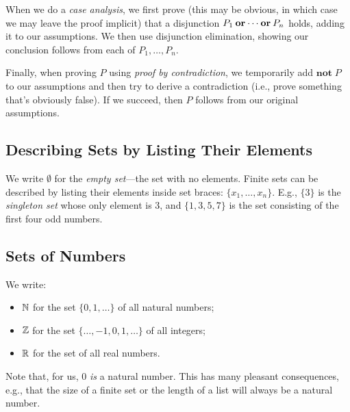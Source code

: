 When we do a \emph{case analysis}, we first prove (this may be
%
%
obvious, in which case we may leave the proof implicit) that a disjunction
$P_1 \mathbin{\mathbf{or}} \cdots \mathbin{\mathbf{or}} P_n$ holds, adding it to our
assumptions. We then use disjunction elimination, showing our
conclusion follows from each of $P_1,\ldots,P_n$.

Finally, when proving $P$ using \emph{proof by contradiction}, we
%
%
temporarily add $\textbf{not}\;P$ to our assumptions and then try to
derive a contradiction (i.e., prove something that's obviously
false). If we succeed, then $P$ follows from our original assumptions.
%
%

\subsection{Describing Sets by Listing Their Elements}

We write $\emptyset$
%
%
%
%
for the \emph{empty set}---the set with no elements.  Finite sets can
be described by listing their elements inside set braces: $\{x_1,
\ldots, x_n\}$.
%
%
E.g., $\{3\}$ is the \emph{singleton set}
%
%
whose only element is $3$, and $\{1, 3, 5, 7\}$ is the set consisting
of the first four odd numbers.

\subsection{Sets of Numbers}

We write:
\begin{itemize}
\item $\mathbb{N}$
%
for the set $\{0, 1, \ldots\}$ of all natural numbers;
%

\item $\mathbb{Z}$
%
for the set $\{\ldots, -1, 0, 1, \ldots\}$ of all integers;
%

\item $\mathbb{R}$
%
for the set of all real numbers.
%
\end{itemize}
Note that, for us, $0$ \emph{is} a natural number.  This has many
pleasant consequences, e.g., that the size of a finite set or
the length of a list will always be a natural number.

